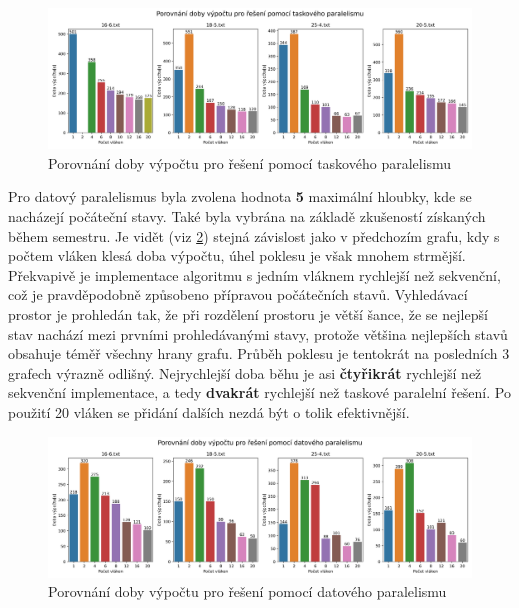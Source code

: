 \begin{figure}[!htbp]
\centerline{\includegraphics[scale=0.52]{report/images/parallel-task-graph.png}}
\caption{Porovnání doby výpočtu pro řešení pomocí taskového paralelismu}
\label{fig:task-graph.png}
\end{figure}
\FloatBarrier

Pro datový paralelismus byla zvolena hodnota \textbf{5} maximální hloubky, kde se nacházejí počáteční stavy.
Také byla vybrána na základě zkušeností získaných během semestru.
Je vidět (viz \ref{fig:data-graph.png}) stejná závislost jako v předchozím grafu, kdy s počtem vláken klesá doba výpočtu, úhel poklesu je však mnohem strmější.
Překvapivě je implementace algoritmu s jedním vláknem rychlejší než sekvenční, což je pravděpodobně způsobeno přípravou počátečních stavů.
Vyhledávací prostor je prohledán tak, že při rozdělení prostoru je větší šance, že se nejlepší stav nachází mezi prvními prohledávanými stavy, protože většina nejlepších stavů obsahuje téměř všechny hrany grafu.
Průběh poklesu je tentokrát na posledních 3 grafech výrazně odlišný.
Nejrychlejší doba běhu je asi \textbf{čtyřikrát} rychlejší než sekvenční implementace, a tedy \textbf{dvakrát} rychlejší než taskové paralelní řešení.
Po použití 20 vláken se přidání dalších nezdá být o tolik efektivnější.

\begin{figure}[!htbp]
\centerline{\includegraphics[scale=0.52]{report/images/parallel-data-graph.png}}
\caption{Porovnání doby výpočtu pro řešení pomocí datového paralelismu}
\label{fig:data-graph.png}
\end{figure}
\FloatBarrier

